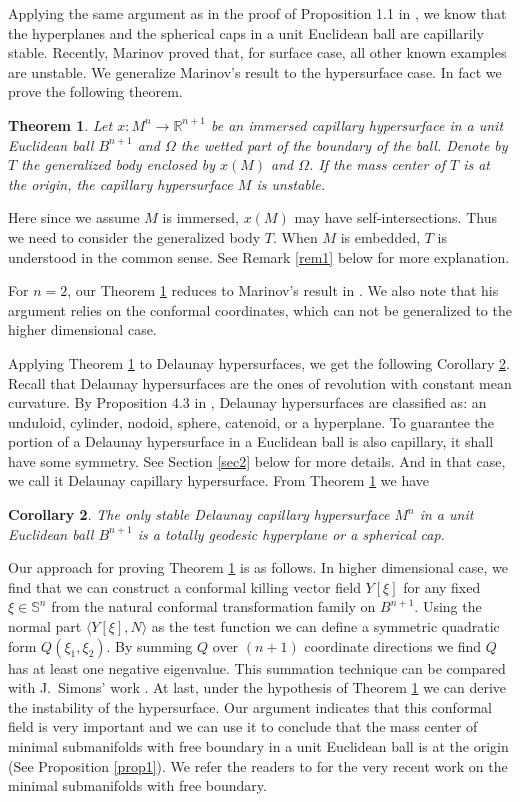 \documentclass[11pt,reqno]{amsart}
\newtheorem{thm}{Theorem}
\newtheorem{corr}[thm]{Corollary}
\theoremstyle{definition}
\begin{document}
Applying the same argument as in the proof of Proposition 1.1 in \cite{RS}, we know that the hyperplanes and the spherical caps in a unit Euclidean ball are capillarily stable. Recently, Marinov \cite{M} proved that, for surface case, all other known examples are unstable. We generalize Marinov's result to the hypersurface case. In fact we prove the following theorem.

\begin{thm}\label{thm1}
Let $x:M^n\rightarrow {\mathbb R}^{n+1}$ be an immersed capillary hypersurface in a unit Euclidean ball $B^{n+1}$ and $\Omega$ the wetted part of the boundary of the ball. Denote by $T$ the generalized body enclosed by $x(M)$ and $\Omega$. If the mass center of $T$ is at the origin, the capillary hypersurface $M$ is unstable.
\end{thm}

Here since we assume $M$ is immersed, $x(M)$ may have self-intersections. Thus we need to consider the generalized body $T$. When $M$ is embedded, $T$ is understood in the common sense. See Remark \ref{rem1} below for more explanation.

For $n=2$, our Theorem \ref{thm1} reduces to Marinov's result in \cite{M}. We also note that his argument relies on the conformal coordinates, which can not be generalized to the higher dimensional case.

Applying Theorem \ref{thm1} to Delaunay hypersurfaces, we get the following Corollary \ref{cor1}. Recall that Delaunay hypersurfaces are the ones of revolution with constant mean curvature. By Proposition 4.3 in \cite{HMRR}, Delaunay hypersurfaces are classified as: an unduloid, cylinder, nodoid, sphere, catenoid, or a hyperplane. To guarantee the portion of a Delaunay hypersurface in a Euclidean ball is also capillary, it shall have some symmetry. See Section \ref{sec2} below for more details. And in that case, we call it Delaunay capillary hypersurface. From Theorem \ref{thm1} we have
\begin{corr}\label{cor1}
The only stable Delaunay capillary hypersurface $M^n$ in a unit Euclidean ball $B^{n+1}$ is a totally geodesic hyperplane or a spherical cap.
\end{corr}

Our approach for proving Theorem \ref{thm1} is as follows. In higher dimensional case, we find that we can construct a conformal killing vector field $Y[\xi]$ for any fixed $\xi\in{\mathbb S}^n$ from the natural conformal transformation family on $B^{n+1}$. Using the normal part ${\langle} Y[\xi],N{\rangle}$ as the test function we can define a symmetric quadratic form $Q(\xi_1,\xi_2)$. By summing $Q$ over $(n+1)$ coordinate directions we find $Q$ has at least one negative eigenvalue. This summation technique can be compared with J.~Simons' work \cite{S}. At last, under the hypothesis of Theorem \ref{thm1} we can derive the instability of the hypersurface. Our argument indicates that this conformal field is very important and we can use it to conclude that the mass center of minimal submanifolds with free boundary in a unit Euclidean ball is at the origin (See Proposition \ref{prop1}). We refer the readers to \cite{FS,FS1,FS2} for the very recent work on the minimal submanifolds with free boundary.
\end{document}
